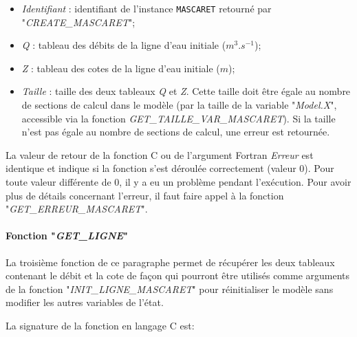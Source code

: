 \documentclass[a4paper,11pt]{article}
\begin{document}
 \begin{itemize}
 
    \item \textit{Identifiant} : identifiant de l'instance \texttt{MASCARET} retourn\'e par "\textit{CREATE\_MASCARET}";
    \vspace{0.5cm}
    \item \textit{Q} : tableau des d\'ebits de la ligne d'eau initiale ($m^3.s^{-1}$);
    \vspace{0.5cm}
    \item \textit{Z} : tableau des cotes de la ligne d'eau initiale ($m$);
    \vspace{0.5cm}
    \item \textit{Taille} : taille des deux tableaux \textit{Q} et \textit{Z}. Cette taille doit \^etre \'egale au nombre de sections de calcul dans le mod\`ele (par la taille de la variable "\textit{Model.X}", accessible via la fonction \textit{GET\_TAILLE\_VAR\_MASCARET}). Si la taille n'est pas \'egale au nombre de sections de calcul, une erreur est retourn\'ee.
 \end{itemize}

\vspace{0.5cm}
 
  La valeur de retour de la fonction C ou de l'argument Fortran
  \textit{Erreur} est identique et indique si la fonction s'est
  d\'eroul\'ee correctement (valeur 0). Pour toute valeur diff\'erente
  de 0, il y a eu un probl\`eme pendant l'ex\'ecution. Pour avoir plus
  de d\'etails concernant l'erreur, il faut faire appel \`a la
  fonction "\textit{GET\_ERREUR\_MASCARET}".

 \paragraph{Fonction "\textit{GET\_LIGNE}"\\}

 \hspace*{1cm}
 
 La troisi\`eme fonction de ce paragraphe permet de r\'ecup\'erer les
 deux tableaux contenant le d\'ebit et la cote de fa\c{c}on qui
 pourront \^etre utilis\'es comme arguments de la fonction
 "\textit{INIT\_LIGNE\_MASCARET}" pour r\'einitialiser le mod\`ele
 sans modifier les autres variables de l'\'etat.
 
 \vspace{0.5cm}
 
 La signature de la fonction en langage C est:
 
\end{document}
